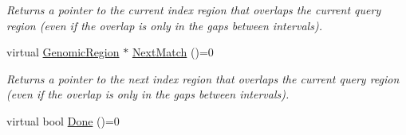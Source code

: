 \begin{DoxyCompactItemize}
\begin{DoxyCompactList}\small\item\em Returns a pointer to the current index region that overlaps the current query region (even if the overlap is only in the gaps between intervals). \end{DoxyCompactList}\item 
\hypertarget{classGenomicRegionSetOverlaps_a402b8d4c8e9b4499a0612899b0b9ba05}{
virtual \hyperlink{classGenomicRegion}{GenomicRegion} $\ast$ \hyperlink{classGenomicRegionSetOverlaps_a402b8d4c8e9b4499a0612899b0b9ba05}{NextMatch} ()=0}
\label{classGenomicRegionSetOverlaps_a402b8d4c8e9b4499a0612899b0b9ba05}

\begin{DoxyCompactList}\small\item\em Returns a pointer to the next index region that overlaps the current query region (even if the overlap is only in the gaps between intervals). \end{DoxyCompactList}\item 
\hypertarget{classGenomicRegionSetOverlaps_a3371a386fed061f58dbd395aff7afefe}{
virtual bool \hyperlink{classGenomicRegionSetOverlaps_a3371a386fed061f58dbd395aff7afefe}{Done} ()=0}
\label{classGenomicRegionSetOverlaps_a3371a386fed061f58dbd395aff7afefe}


\end{DoxyCompactItemize}
